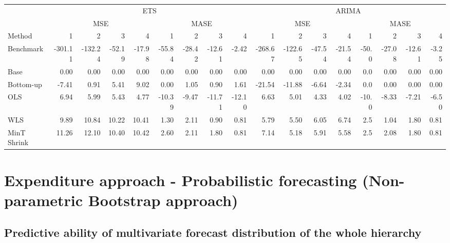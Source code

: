 \documentclass[]{article}
\begin{document}
\begin{table}[H]
\centering
\begin{tabular}{l|r|r|r|r|r|r|r|r|r|r|r|r|r|r|r|r}
\hline
\multicolumn{1}{c|}{ } & \multicolumn{8}{|c|}{ETS} & \multicolumn{8}{|c}{ARIMA} \\
\cline{2-9} \cline{10-17}
\multicolumn{1}{c|}{ } & \multicolumn{4}{|c|}{MSE} & \multicolumn{4}{|c|}{MASE} & \multicolumn{4}{|c|}{MSE} & \multicolumn{4}{|c}{MASE} \\
\cline{2-5} \cline{6-9} \cline{10-13} \cline{14-17}
Method & 1 & 2 & 3 & 4 & 1 & 2 & 3 & 4 & 1 & 2 & 3 & 4 & 1 & 2 & 3 & 4\\
\hline
Benchmark & -301.11 & -132.24 & -52.19 & -17.98 & -55.84 & -28.42 & -12.61 & -2.42 & -268.67 & -122.65 & -47.54 & -21.54 & -50.0 & -27.08 & -12.61 & -3.25\\
\hline
Base & 0.00 & 0.00 & 0.00 & 0.00 & 0.00 & 0.00 & 0.00 & 0.00 & 0.00 & 0.00 & 0.00 & 0.00 & 0.0 & 0.00 & 0.00 & 0.00\\
\hline
Bottom-up & -7.41 & 0.91 & 5.41 & 9.02 & 0.00 & 1.05 & 0.90 & 1.61 & -21.54 & -11.88 & -6.64 & -2.34 & 0.0 & 0.00 & 0.00 & 0.00\\
\hline
OLS & 6.94 & 5.99 & 5.43 & 4.77 & -10.39 & -9.47 & -11.71 & -12.10 & 6.63 & 5.01 & 4.33 & 4.02 & -10.0 & -8.33 & -7.21 & -6.50\\
\hline
WLS & 9.89 & 10.84 & 10.22 & 10.41 & 1.30 & 2.11 & 0.90 & 0.81 & 5.79 & 5.50 & 6.05 & 6.74 & 2.5 & 1.04 & 1.80 & 0.81\\
\hline
MinT Shrink & 11.26 & 12.10 & 10.40 & 10.42 & 2.60 & 2.11 & 1.80 & 0.81 & 7.14 & 5.18 & 5.91 & 5.58 & 2.5 & 2.08 & 1.80 & 0.81\\
\hline
\end{tabular}
\end{table}

\section{Expenditure approach - Probabilistic forecasting
(Non-parametric Bootstrap
approach)}\label{expenditure-approach---probabilistic-forecasting-non-parametric-bootstrap-approach}

\subsection{Predictive ability of multivariate forecast distribution of
the whole
hierarchy}\label{predictive-ability-of-multivariate-forecast-distribution-of-the-whole-hierarchy}
\end{document}
